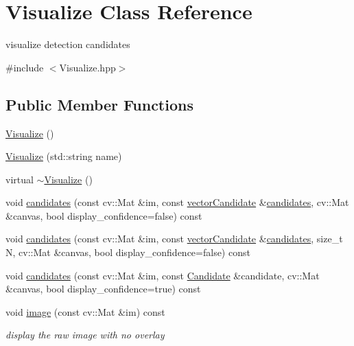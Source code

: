 \hypertarget{classVisualize}{\section{\-Visualize \-Class \-Reference}
\label{classVisualize}
}


visualize detection candidates  




{\ttfamily \#include $<$\-Visualize.\-hpp$>$}

\subsection*{\-Public \-Member \-Functions}
\begin{DoxyCompactItemize}
\item 
\hyperlink{classVisualize_a8d4163ad53518ec0c8a3eaec2bf2fe7b}{\-Visualize} ()
\item 
\hyperlink{classVisualize_aa4934674b915dc27dd262c5b5a6970b0}{\-Visualize} (std\-::string name)
\item 
virtual \hyperlink{classVisualize_a50a487bde1d6e77a2b16a2abb28dd066}{$\sim$\-Visualize} ()
\item 
void \hyperlink{classVisualize_ada4023e56a4a59e9b8ecd6c1d8c4c99b}{candidates} (const cv\-::\-Mat \&im, const \hyperlink{types_8hpp_a04eefdf70d6c6b8effb5170271f1db05}{vector\-Candidate} \&\hyperlink{classVisualize_ada4023e56a4a59e9b8ecd6c1d8c4c99b}{candidates}, cv\-::\-Mat \&canvas, bool display\-\_\-confidence=false) const 
\item 
void \hyperlink{classVisualize_a6a24ad950e8e20d89a908cf87b709a94}{candidates} (const cv\-::\-Mat \&im, const \hyperlink{types_8hpp_a04eefdf70d6c6b8effb5170271f1db05}{vector\-Candidate} \&\hyperlink{classVisualize_ada4023e56a4a59e9b8ecd6c1d8c4c99b}{candidates}, size\-\_\-t \-N, cv\-::\-Mat \&canvas, bool display\-\_\-confidence=false) const 
\item 
void \hyperlink{classVisualize_a49be21958241fe18358d999483d734e2}{candidates} (const cv\-::\-Mat \&im, const \hyperlink{classCandidate}{\-Candidate} \&candidate, cv\-::\-Mat \&canvas, bool display\-\_\-confidence=true) const 
\item 
void \hyperlink{classVisualize_a0464561197342e3a26d2f2bf317f3611}{image} (const cv\-::\-Mat \&im) const 
\begin{DoxyCompactList}\small\item\em display the raw image with no overlay \end{DoxyCompactList}\end{DoxyCompactItemize}
